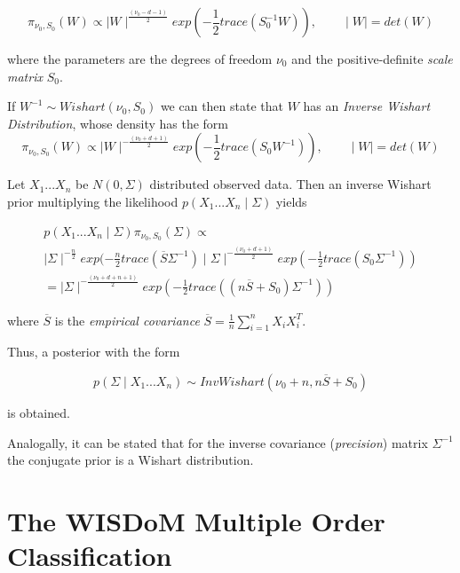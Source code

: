 \documentclass[12pt,openright,twoside,a4paper]{book}
\begin{document}
\begin{equation}
\pi_{\nu_0, S_0}(W)\propto \mid W\mid ^{\frac{(\nu_0-d-1)}{2}}exp(-\frac{1}{2}trace(S_0^{-1}W)), \qquad \mid W\mid=det(W)
\end{equation}

where the parameters are the degrees of freedom $\nu_0$ and the positive-definite \textit{scale matrix}
$S_0$.

If $W^{-1}\sim Wishart(\nu_0, S_0)$ we can then state that $W$ has an \textit{Inverse Wishart Distribution}, whose density has the form
\begin{equation}
\pi_{\nu_0, S_0}(W)\propto \mid W\mid ^{-\frac{(\nu_0+d+1)}{2}}exp(-\frac{1}{2}trace(S_0W^{-1})), \qquad \mid W\mid=det(W)
\end{equation}

Let $X_1...X_n$ be $N(0,\Sigma)$ distributed observed data. Then an inverse Wishart prior multiplying the likelihood $p(X_1...X_n\mid \Sigma)$ yields

\begin{equation}
\begin{aligned}
p(X_1...X_n\mid \Sigma)\pi_{\nu_0, S_0}(\Sigma)\propto \\[10pt]
 \mid\Sigma \mid ^{-\frac{n}{2}}exp(-\frac{n}{2}trace(\overline{S} \Sigma^{-1}) \mid \Sigma\mid ^{-\frac{(\nu_0+d+1)}{2}}exp(-\frac{1}{2}trace(S_0\Sigma^{-1})) \\[10pt]  
=  \mid \Sigma\mid ^{-\frac{(\nu_0+d+n+1)}{2}}exp(-\frac{1}{2}trace((n\overline{S}+S_0)\Sigma^{-1}))
\end{aligned}
\end{equation}

where $\overline{S}$ is the \textit{empirical covariance} $\overline{S}=\frac{1}{n}\sum_{i=1}
^nX_iX_i^T$.

Thus, a posterior with the form

\begin{equation}
p(\Sigma\mid X_1...X_n)\sim InvWishart(\nu_0+n, n\overline{S}+S_0)
\end{equation}

is obtained.

Analogally, it can be stated that for the inverse covariance (\textit{precision}) matrix $\Sigma^{-1}$ the conjugate prior is a Wishart distribution.

\chapter{The WISDoM Multiple Order Classification}
\end{document}
